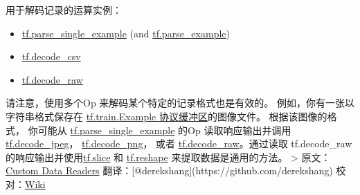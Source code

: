 用于解码记录的运算实例：

\begin{itemize}
\tightlist
\item
  \href{tensorflow-zh/SOURCE/api_docs/python/io_ops.md\#parse_single_example}{tf.parse\_single\_example}
  (and
  \href{tensorflow-zh/SOURCE/api_docs/python/io_ops.md\#parse_example}{tf.parse\_example})
\item
  \href{tensorflow-zh/SOURCE/api_docs/python/io_ops.md\#decode_csv}{tf.decode\_csv}
\item
  \href{tensorflow-zh/SOURCE/api_docs/python/io_ops.md\#decode_raw}{tf.decode\_raw}
\end{itemize}

请注意，使用多个Op 来解码某个特定的记录格式也是有效的。
例如，你有一张以字符串格式保存在
\href{https://tensorflow.googlesource.com/tensorflow/+/master/tensorflow/core/example/example.proto}{tf.train.Example
协议缓冲区}的图像文件。 根据该图像的格式， 你可能从
\href{tensorflow-zh/SOURCE/api_docs/python/io_ops.md\#parse_single_example}{tf.parse\_single\_example}
的Op 读取响应输出并调用
\href{tensorflow-zh/SOURCE/api_docs/python/image.md\#decode_jpeg}{tf.decode\_jpeg}，
\href{tensorflow-zh/SOURCE/api_docs/python/image.md\#decode_png}{tf.decode\_png}，
或者
\href{tensorflow-zh/SOURCE/api_docs/python/io_ops.md\#decode_raw}{tf.decode\_raw}。通过读取
tf.decode\_raw
的响应输出并使用\href{tensorflow-zh/SOURCE/api_docs/python/array_ops.md\#slice}{tf.slice}
和
\href{tensorflow-zh/SOURCE/api_docs/python/array_ops.md\#reshape}{tf.reshape}
来提取数据是通用的方法。 \textgreater{}
原文：\href{http://tensorflow.org/how_tos/new_data_formats/index.html\#custom-data-readers}{Custom
Data Readers} 翻译：{[}@derekshang{]}(https://github.com/derekshang)
校对：\href{https://github.com/jikexueyuanwiki}{Wiki}